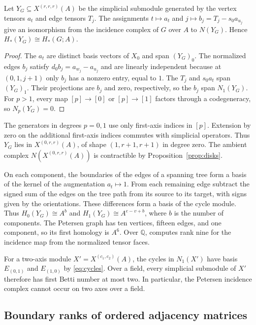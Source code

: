 \begin{proposition}\label{prop:graph}
Let $Y_G\subseteq X^{(r,r,r)}(A)$ be the simplicial submodule generated by
the vertex tensors $a_t$ and edge tensors $T_j$. The assignments
$t\mapsto a_t$ and $j\mapsto b_j=T_j-s_0a_{u_j}$ give an isomorphism
from the incidence complex of $G$ over $A$ to $N(Y_G)$.
Hence $H_*(Y_G)\cong H_*(G;A)$.
\end{proposition}
\begin{proof}
The $a_t$ are distinct basis vectors of $X_0$ and span $(Y_G)_0$.
The normalized edges $b_j$ satisfy $d_0b_j=a_{w_j}-a_{u_j}$ and are linearly
independent because at $(0,1,j+1)$ only $b_j$ has a nonzero entry, equal to $1$.
The $T_j$ and $s_0a_t$ span $(Y_G)_1$. Their projections are $b_j$ and zero,
respectively, so the $b_j$ span $N_1(Y_G)$. For $p>1$,
every map $[p]\to[0]$ or $[p]\to[1]$ factors through a codegeneracy,
so $N_p(Y_G)=0$.
\end{proof}

The generators in degrees $p=0,1$ use only first-axis indices in $[p]$.
Extension by zero on the additional first-axis indices commutes with simplicial
operators. Thus $Y_G$ lies in $X^{(0,r,r)}(A)$, of shape $(1,r+1,r+1)$ in degree
zero. The ambient complex $N(X^{(0,r,r)}(A))$ is contractible by Proposition~\ref{prop:disks}.

On each component, the boundaries of the edges of a spanning tree form
a basis of the kernel of the augmentation $a_t\mapsto 1$.
From each remaining edge subtract the signed sum of the edges on the tree
path from its source to its target, with signs given by the orientations.
These differences form a basis of the cycle module.
Thus $H_0(Y_G)\cong A^b$ and $H_1(Y_G)\cong A^{e-v+b}$, where $b$
is the number of components. The Petersen graph has ten vertices,
fifteen edges, and one component, so its first homology is $A^6$.
Over $\mathbb Q$,
computes rank nine for the incidence map from the normalized tensor faces.

For a two-axis module $X'=X^{(c_1,c_2)}(A)$, the cycles in $N_1(X')$ have basis $E_{(0,1)}$ and
$E_{(1,0)}$ by \eqref{eq:cycles}. Over a field, every simplicial
submodule of $X'$ therefore has first Betti number at most two. In particular,
the Petersen incidence complex cannot occur on two axes over a field.

\subsection{Boundary ranks of ordered adjacency matrices}

